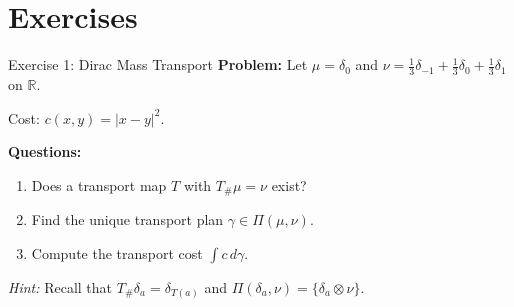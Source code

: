 \documentclass[aspectratio=169]{beamer}
\newcommand{\R}{\mathbb{R}}
\begin{document}
\section{Exercises}

\begin{frame}{Exercise 1: Dirac Mass Transport}
\textbf{Problem:} Let $\mu = \delta_0$ and $\nu = \frac{1}{3}\delta_{-1} + \frac{1}{3}\delta_0 + \frac{1}{3}\delta_1$ on $\R$.

Cost: $c(x,y) = |x-y|^2$.

\vspace{0.4cm}
\textbf{Questions:}
\begin{enumerate}
    \item[(a)] Does a transport map $T$ with $T_\# \mu = \nu$ exist?
    \item[(b)] Find the unique transport plan $\gamma \in \Pi(\mu, \nu)$.
    \item[(c)] Compute the transport cost $\int c \, d\gamma$.
\end{enumerate}

\vspace{0.4cm}
\textit{Hint:} Recall that $T_\# \delta_a = \delta_{T(a)}$ and $\Pi(\delta_a, \nu) = \{\delta_a \otimes \nu\}$.
\end{frame}
\end{document}
